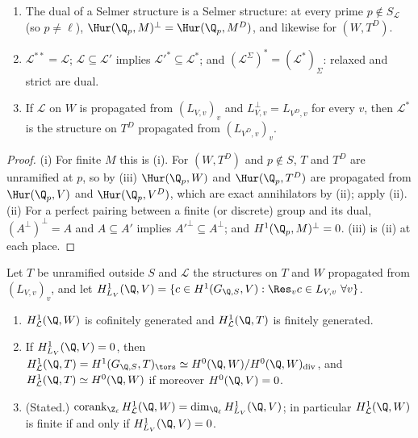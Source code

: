 \begin{proposition}\label{prop:galcoh:dual-structure}
\begin{enumerate}[label=(\roman*)]
\item The dual of a Selmer structure is a Selmer structure: at every prime $p\notin S_{\mathcal L}$ (so $p\ne\ell$), $\Hur(\Q_p,M)^\perp=\Hur(\Q_p,M^D)$, and likewise for
$(W,T^D)$.
\item $\mathcal L^{**}=\mathcal L$; $\mathcal L\subseteq\mathcal L'$ implies $\mathcal L'^*\subseteq\mathcal L^*$; and $(\mathcal L^\Sigma)^*=(\mathcal L^*)_\Sigma$: relaxed and strict are dual.
\item If $\mathcal L$ on $W$ is propagated from $(L_{V,v})_v$ and $L_{V,v}^\perp=L_{V^D,v}$ for every $v$, then $\mathcal L^*$ is the structure on $T^D$ propagated from
$(L_{V^D,v})_v$.
\end{enumerate}
\end{proposition}

\begin{proof}
(i) For finite $M$ this is (i). For $(W,T^D)$ and $p\notin S$, $T$ and $T^D$ are unramified at $p$, so by
(iii) $\Hur(\Q_p,W)$ and $\Hur(\Q_p,T^D)$ are propagated from $\Hur(\Q_p,V)$ and $\Hur(\Q_p,V^D)$, which are exact annihilators by
(ii); apply (ii).
(ii) For a perfect pairing between a finite (or discrete) group and its dual, $(A^\perp)^\perp=A$ and $A\subseteq A'$ implies $A'^\perp\subseteq A^\perp$; and $H^1(\Q_p,M)^\perp=0$.
(iii) is (ii) at each place.
\end{proof}

\begin{proposition}\label{prop:galcoh:selmer-l-adic}
Let $T$ be unramified outside $S$ and $\mathcal L$ the structures on $T$ and $W$ propagated from $(L_{V,v})_v$, and let
$H^1_{L_V}(\Q,V)=\{c\in H^1(G_{\Q,S},V):\Res_vc\in L_{V,v}\ \forall v\}$.
\begin{enumerate}[label=(\roman*)]
\item $H^1_{\mathcal L}(\Q,W)$ is cofinitely generated and $H^1_{\mathcal L}(\Q,T)$ is finitely generated.
\item If $H^1_{L_V}(\Q,V)=0$, then $H^1_{\mathcal L}(\Q,T)=H^1(G_{\Q,S},T)_{\tors}\simeq H^0(\Q,W)/H^0(\Q,W)_{\mathrm{div}}$, and $H^1_{\mathcal L}(\Q,T)\simeq H^0(\Q,W)$ if moreover
$H^0(\Q,V)=0$.
\item (Stated.) $\operatorname{corank}_{\Z_\ell}H^1_{\mathcal L}(\Q,W)=\dim_{\Q_\ell}H^1_{L_V}(\Q,V)$; in particular $H^1_{\mathcal L}(\Q,W)$ is finite if and only if $H^1_{L_V}(\Q,V)=0$.
\end{enumerate}
\end{proposition}

